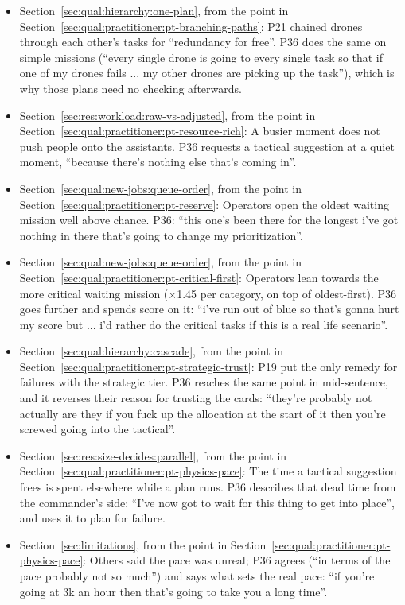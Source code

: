 \begin{itemize}[leftmargin=1.2em,itemsep=1pt]
\item Section~\ref{sec:qual:hierarchy:one-plan}, from the point in Section~\ref{sec:qual:practitioner:pt-branching-paths}: P21 chained drones through each other's tasks for ``redundancy for free''. P36 does the same on simple missions (``every single drone is going to every single task so that if one of my drones fails ... my other drones are picking up the task''), which is why those plans need no checking afterwards.
\item Section~\ref{sec:res:workload:raw-vs-adjusted}, from the point in Section~\ref{sec:qual:practitioner:pt-resource-rich}: A busier moment does not push people onto the assistants. P36 requests a tactical suggestion at a quiet moment, ``because there's nothing else that's coming in''.
\item Section~\ref{sec:qual:new-jobs:queue-order}, from the point in Section~\ref{sec:qual:practitioner:pt-reserve}: Operators open the oldest waiting mission well above chance. P36: ``this one's been there for the longest i've got nothing in there that's going to change my prioritization''.
\item Section~\ref{sec:qual:new-jobs:queue-order}, from the point in Section~\ref{sec:qual:practitioner:pt-critical-first}: Operators lean towards the more critical waiting mission ($\times$1.45 per category, on top of oldest-first). P36 goes further and spends score on it: ``i've run out of blue so that's gonna hurt my score but ... i'd rather do the critical tasks if this is a real life scenario''.
\item Section~\ref{sec:qual:hierarchy:cascade}, from the point in Section~\ref{sec:qual:practitioner:pt-strategic-trust}: P19 put the only remedy for failures with the strategic tier. P36 reaches the same point in mid-sentence, and it reverses their reason for trusting the cards: ``they're probably not actually are they if you fuck up the allocation at the start of it then you're screwed going into the tactical''.
\item Section~\ref{sec:res:size-decides:parallel}, from the point in Section~\ref{sec:qual:practitioner:pt-physics-pace}: The time a tactical suggestion frees is spent elsewhere while a plan runs. P36 describes that dead time from the commander's side: ``I've now got to wait for this thing to get into place'', and uses it to plan for failure.
\item Section~\ref{sec:limitations}, from the point in Section~\ref{sec:qual:practitioner:pt-physics-pace}: Others said the pace was unreal; P36 agrees (``in terms of the pace probably not so much'') and says what sets the real pace: ``if you're going at 3k an hour then that's going to take you a long time''.

\end{itemize}
